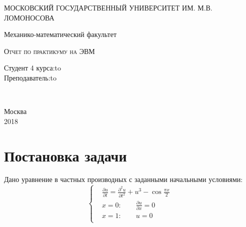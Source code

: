 \documentclass[12pt]{extarticle}
\numberwithin{equation}{section}
\begin{document}
\begin{titlepage} \newpage 
\begin{center} МОСКОВСКИЙ ГОСУДАРСТВЕННЫЙ УНИВЕРСИТЕТ ИМ. М.В. ЛОМОНОСОВА\end{center} 
\vspace{8em} \begin{center} 
\Large Механико-математический факультет \\ \end{center}
\vspace{2em} \begin{center} 
\textsc{Отчет по практикуму на ЭВМ \linebreak 
\textbf{}} \end{center}
\vspace{6em} \newbox{\lbox}  
\newlength{\maxl} \setlength{\maxl}{\wd\lbox} \hfill\parbox{12	cm}
{ \hspace*{10cm}\hspace*{-5cm}Студент 4 курса:\hfill\hbox to\\
\hspace*{10cm}\hspace*{-5cm}Преподаватель:\hfill\hbox to}\\  \vspace{\fill}
\begin{center} Москва \\ 2018\end{center} \end{titlepage}


\tableofcontents
\renewcommand{\figurename}{График}
\renewcommand{\theequation}{\thesection.\arabic{equation}}


\newpage

\section{Постановка задачи} \label{sec:1-postanovka-zadachi}
Дано уравнение в частных производных с заданными начальными условиями:
\begin{equation}
\left\{
	\begin{aligned}
&\frac{\partial u}{\partial t} = \frac{\partial ^2 u}{\partial t^2} + u^3 - \cos \frac{\pi x}{2} \\
& x = 0: \qquad \frac{\partial u}{\partial x} = 0\\
& x = 1: \qquad u = 0 \\
	\end{aligned}
\right.
\label{eq:1-nachal-zadacha}
\end{equation}
\end{document}
